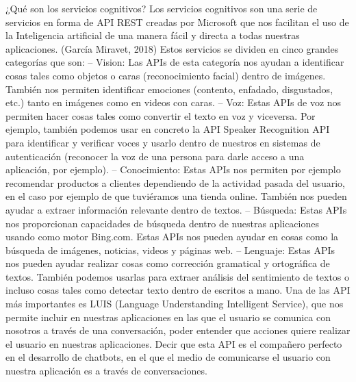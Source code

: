 ¿Qué son los servicios cognitivos?
Los servicios cognitivos son una serie de servicios en forma de API REST creadas por Microsoft que nos facilitan el uso de la Inteligencia artificial de una manera fácil y directa a todas nuestras aplicaciones. (García Miravet, 2018)
Estos servicios se dividen en cinco grandes categorías que son:
– Vision: Las APIs de esta categoría nos ayudan a identificar cosas tales como objetos o caras (reconocimiento facial) dentro de imágenes. También nos permiten identificar emociones (contento, enfadado, disgustados, etc.) tanto en imágenes como en videos con caras.
– Voz: Estas APIs de voz nos permiten hacer cosas tales como convertir el texto en voz y viceversa. Por ejemplo, también podemos usar en concreto la API Speaker Recognition API para identificar y verificar voces y usarlo dentro de nuestros en sistemas de autenticación (reconocer la voz de una persona para darle acceso a una aplicación, por ejemplo).
– Conocimiento: Estas APIs nos permiten por ejemplo recomendar productos a clientes dependiendo de la actividad pasada del usuario, en el caso por ejemplo de que tuviéramos una tienda online. También nos pueden ayudar a extraer información relevante dentro de textos.
– Búsqueda: Estas APIs nos proporcionan capacidades de búsqueda dentro de nuestras aplicaciones usando como motor Bing.com. Estas APIs nos pueden ayudar en cosas como la búsqueda de imágenes, noticias, videos y páginas web.
– Lenguaje: Estas APIs nos pueden ayudar realizar cosas como corrección gramatical y ortográfica de textos. También podemos usarlas para extraer análisis del sentimiento de textos o incluso cosas tales como detectar texto dentro de escritos a mano.
Una de las API más importantes es LUIS (Language Understanding Intelligent Service), que nos permite incluir en nuestras aplicaciones en las que el usuario se comunica con nosotros a través de una conversación, poder entender que acciones quiere realizar el usuario en nuestras aplicaciones. Decir que esta API es el compañero perfecto en el desarrollo de chatbots, en el que el medio de comunicarse el usuario con nuestra aplicación es a través de conversaciones.

